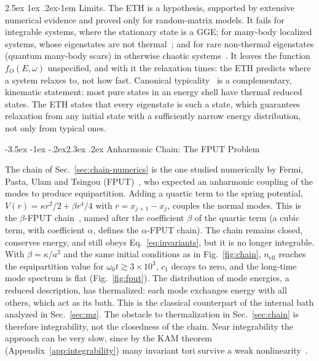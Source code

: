 \documentclass[10pt,a4paper]{article}
\makeatletter
\renewcommand{\section}{\@startsection{section}{1}{\z@}%
  {-3.5ex \@plus -1ex \@minus -.2ex}{2.3ex \@plus .2ex}%
  {\normalfont\fontsize{18pt}{22pt}\selectfont\bfseries}}
\renewcommand{\paragraph}{\@startsection{paragraph}{4}{\z@}%
  {2.5ex \@plus 1ex \@minus .2ex}{-1em}%
  {\normalfont\fontsize{14pt}{17pt}\selectfont\bfseries}}
\makeatother
\begin{document}
\paragraph{Limits.}
The ETH is a hypothesis, supported by extensive numerical evidence and proved only for random-matrix models.
It fails for integrable systems, where the stationary state is a GGE; for many-body localized systems, whose eigenstates are not thermal~\cite{Nandkishore2015}; and for rare non-thermal eigenstates (quantum many-body scars) in otherwise chaotic systems~\cite{Turner2018}.
It leaves the function $ f_O(E,\omega) $ unspecified, and with it the relaxation times: the ETH predicts where a system relaxes to, not how fast.
Canonical typicality~\cite{Goldstein2006,Popescu2006} is a complementary, kinematic statement: most pure states in an energy shell have thermal reduced states. The ETH states that every eigenstate is such a state, which guarantees relaxation from any initial state with a sufficiently narrow energy distribution, not only from typical ones.

\section{Anharmonic Chain: The FPUT Problem}
\label{app:fput}

The chain of Sec.~\ref{sec:chain-numerics} is the one studied numerically by Fermi, Pasta, Ulam and Tsingou (FPUT)~\cite{FPU1955}, who expected an anharmonic coupling of the modes to produce equipartition.
Adding a quartic term to the spring potential, $ V(r) = \kappa r^2/2 + \beta r^4/4 $ with $ r = x_{j+1} - x_j $, couples the normal modes.
This is the $ \beta $-FPUT chain~\cite{FPU1955,Berman2005}, named after the coefficient $ \beta $ of the quartic term (a cubic term, with coefficient $ \alpha $, defines the $ \alpha $-FPUT chain).
The chain remains closed, conserves energy, and still obeys Eq.~\eqref{eq:invariants}, but it is no longer integrable.
With $ \beta = \kappa/a^2 $ and the same initial conditions as in Fig.~\ref{fig:chain}, $ n_{\mathrm{eff}} $ reaches the equipartition value for $ \omega_0 t \gtrsim 3\times 10^3 $, $ c_1 $ decays to zero, and the long-time mode spectrum is flat (Fig.~\ref{fig:fput}).
The distribution of mode energies, a reduced description, has thermalized: each mode exchanges energy with all others, which act as its bath.
This is the classical counterpart of the internal bath analyzed in Sec.~\ref{sec:mz}.
The obstacle to thermalization in Sec.~\ref{sec:chain} is therefore integrability, not the closedness of the chain.
Near integrability the approach can be very slow, since by the KAM theorem (Appendix~\ref{app:integrability}) many invariant tori survive a weak nonlinearity~\cite{Berman2005}.
\end{document}
